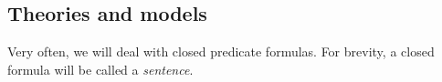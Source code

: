 \subsection{Theories and models}
Very often, we will deal with closed predicate formulas.
For brevity, a closed formula will be called a \emph{sentence}.
